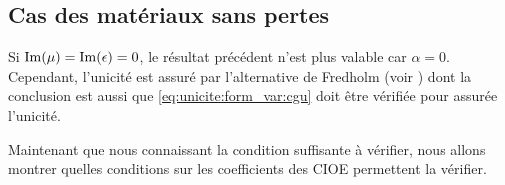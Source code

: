 \subsection{Cas des matériaux sans pertes}

  Si \(\operatorname{Im}(\mu) = \operatorname{Im}(\epsilon) = 0\), le résultat précédent n'est plus valable car \(\alpha = 0\). Cependant, l'unicité est assuré par l’alternative de Fredholm (voir \cite[Théorème 8]{cessenat_mathematical_1996}) dont la conclusion est aussi que \ref{eq:unicite:form_var:cgu} doit être vérifiée pour assurée l'unicité.

  Maintenant que nous connaissant la condition suffisante à vérifier, nous allons montrer quelles conditions sur les coefficients des CIOE permettent la vérifier.